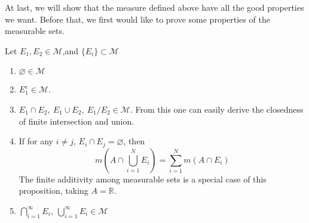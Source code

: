 \documentclass[lang=en, 12pt]{elegantbook}
\begin{document}
        At last, we will show that the measure defined above have all the good properties we want. Before that, we first would like to 
        prove some properties of the measurable sets.
            \begin{proposition} 
                Let $E_1, E_2 \in \mathcal{M}$,and $\{E_i\} \subset \mathcal{M}$\par
                \begin{enumerate}
                    \item $\varnothing \in \mathcal{M}$
                    \item $E_1^c \in \mathcal{M}$.
                    \item $E_1 \cap E_2, \ E_1 \cup E_2, \ E_1/E_2 \in \mathcal{M}$. From this one can easily derive the closedness of finite 
                intersection and union.
                    \item If for any $i \neq j$, $E_i \cap E_j = \varnothing$, then 
                    $$m(A \cap \bigcup_{i=1}^{N}E_i) = \sum_{i=1}^{N}m(A \cap E_i)$$
                    The finite additivity among measurable sets is a special case of this proposition, taking $A=\mathbb{R}$. 
                    \item $\bigcap_{i=1}^{\infty} E_i, \ \bigcup_{i=1}^{\infty} E_i \in \mathcal{M}$
                \end{enumerate}\par
                
            \end{proposition}
\end{document}
